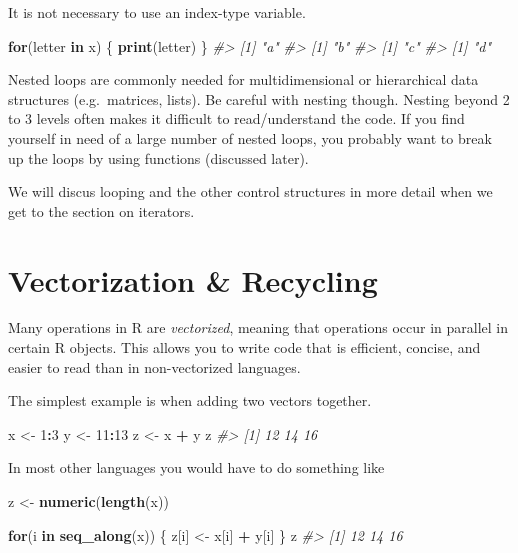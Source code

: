 \documentclass[]{book}
\newenvironment{Shaded}{\begin{snugshade}}{\end{snugshade}}
\newcommand{\KeywordTok}[1]{\textcolor[rgb]{0.13,0.29,0.53}{\textbf{#1}}}
\newcommand{\DecValTok}[1]{\textcolor[rgb]{0.00,0.00,0.81}{#1}}
\newcommand{\StringTok}[1]{\textcolor[rgb]{0.31,0.60,0.02}{#1}}
\newcommand{\CommentTok}[1]{\textcolor[rgb]{0.56,0.35,0.01}{\textit{#1}}}
\newcommand{\ControlFlowTok}[1]{\textcolor[rgb]{0.13,0.29,0.53}{\textbf{#1}}}
\newcommand{\OperatorTok}[1]{\textcolor[rgb]{0.81,0.36,0.00}{\textbf{#1}}}
\newcommand{\NormalTok}[1]{#1}
\let\BeginKnitrBlock\begin \let\EndKnitrBlock\end
\begin{document}
It is not necessary to use an index-type variable.

\begin{Shaded}
\begin{Highlighting}[]
\ControlFlowTok{for}\NormalTok{(letter }\ControlFlowTok{in}\NormalTok{ x) \{}
        \KeywordTok{print}\NormalTok{(letter)}
\NormalTok{\}}
\CommentTok{#> [1] "a"}
\CommentTok{#> [1] "b"}
\CommentTok{#> [1] "c"}
\CommentTok{#> [1] "d"}
\end{Highlighting}
\end{Shaded}

\BeginKnitrBlock{rmdtip}
Nested loops are commonly needed for multidimensional or hierarchical
data structures (e.g.~matrices, lists). Be careful with nesting though.
Nesting beyond 2 to 3 levels often makes it difficult to read/understand
the code. If you find yourself in need of a large number of nested
loops, you probably want to break up the loops by using functions
(discussed later).
\EndKnitrBlock{rmdtip}

We will discus looping and the other control structures in more detail
when we get to the section on iterators.

\section{Vectorization \& Recycling}\label{vectorization-recycling}

Many operations in R are \emph{vectorized}, meaning that operations
occur in parallel in certain R objects. This allows you to write code
that is efficient, concise, and easier to read than in non-vectorized
languages.

The simplest example is when adding two vectors together.

\begin{Shaded}
\begin{Highlighting}[]
\NormalTok{x <-}\StringTok{ }\DecValTok{1}\OperatorTok{:}\DecValTok{3}
\NormalTok{y <-}\StringTok{ }\DecValTok{11}\OperatorTok{:}\DecValTok{13}
\NormalTok{z <-}\StringTok{ }\NormalTok{x }\OperatorTok{+}\StringTok{ }\NormalTok{y}
\NormalTok{z}
\CommentTok{#> [1] 12 14 16}
\end{Highlighting}
\end{Shaded}

In most other languages you would have to do something like

\begin{Shaded}
\begin{Highlighting}[]
\NormalTok{z <-}\StringTok{ }\KeywordTok{numeric}\NormalTok{(}\KeywordTok{length}\NormalTok{(x))}

\ControlFlowTok{for}\NormalTok{(i }\ControlFlowTok{in} \KeywordTok{seq_along}\NormalTok{(x)) \{}
\NormalTok{      z[i] <-}\StringTok{ }\NormalTok{x[i] }\OperatorTok{+}\StringTok{ }\NormalTok{y[i]}
\NormalTok{\}}
\NormalTok{z}
\CommentTok{#> [1] 12 14 16}
\end{Highlighting}
\end{Shaded}
\end{document}
